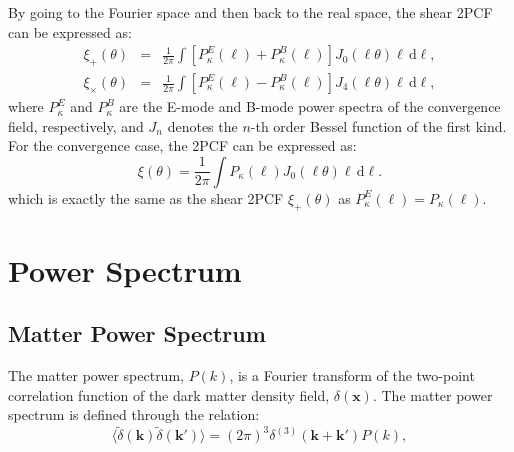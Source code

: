 By going to the Fourier space and then back to the real space, the shear 2PCF can be expressed as:
\begin{eqnarray}
    \xi_+(\theta) &=& \frac{1}{2\pi} \int \left[P_\kappa^E(\ell) + P_\kappa^B(\ell)\right] J_0(\ell \theta) \ell \, \mathrm{d}\ell, \\
    \xi_\times(\theta) &=& \frac{1}{2\pi} \int \left[P_\kappa^E(\ell) - P_\kappa^B(\ell)\right] J_4(\ell \theta) \ell \, \mathrm{d}\ell,
\end{eqnarray}
where $P_\kappa^E$ and $P_\kappa^B$ are the E-mode and B-mode power spectra of the convergence field, respectively, and $J_n$ denotes the $n$-th order Bessel function of the first kind.
For the convergence case, the 2PCF can be expressed as:
\begin{equation}
    \xi(\theta) = \frac{1}{2\pi} \int P_\kappa(\ell) J_0(\ell \theta) \ell \, \mathrm{d}\ell.
\end{equation}
which is exactly the same as the shear 2PCF $\xi_+(\theta)$ as $P_\kappa^E(\ell) = P_\kappa(\ell)$.

\section{Power Spectrum}
\subsection{Matter Power Spectrum}
The matter power spectrum, \( P(k) \), is a Fourier transform of the two-point correlation function of the dark matter density field, \( \delta(\mathbf{x}) \).
The matter power spectrum is defined through the relation:
\begin{equation}
    \langle \tilde{\delta}(\mathbf{k}) \tilde{\delta}(\mathbf{k}') \rangle = (2\pi)^3 \delta^{(3)}(\mathbf{k} + \mathbf{k}') P(k),
    \label{eq:matter_power_spectrum}
\end{equation}
